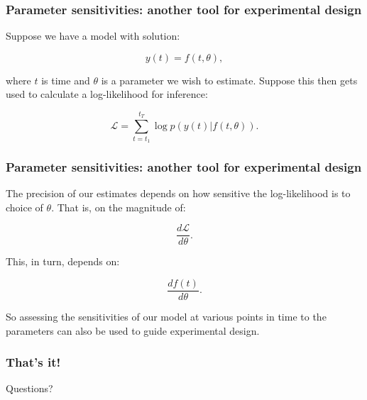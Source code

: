 \documentclass[handout]{beamer}
\begin{document}
\begin{frame}
	\frametitle{Parameter sensitivities: another tool for experimental design}
	
	Suppose we have a model with solution:
	
	\begin{equation}
	y(t) = f(t, \theta),
	\end{equation}
	
	where $t$ is time and $\theta$ is a parameter we wish to estimate. Suppose this then gets used to calculate a log-likelihood for inference:
	
	\begin{equation}
	\mathcal{L} = \sum_{t=t_1}^{t_T} \log p(y(t)|f(t, \theta)).
	\end{equation}
	
\end{frame}

\begin{frame}
	\frametitle{Parameter sensitivities: another tool for experimental design}
	
	The precision of our estimates depends on how sensitive the log-likelihood is to choice of $\theta$. That is, on the magnitude of:
	
	\begin{equation}
	\frac{d\mathcal{L}}{d\theta}.
	\end{equation}
	
	This, in turn, depends on:
	
	\begin{equation}
	\frac{d f(t)}{d \theta}.
	\end{equation}
	
	So assessing the sensitivities of our model at various points in time to the parameters can also be used to guide experimental design.
	
\end{frame}

\begin{frame}
	\frametitle{That's it!}
	
	\Large Questions?
\end{frame}
\end{document}
